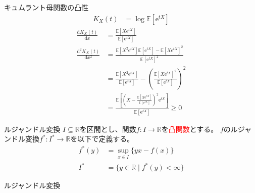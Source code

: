\documentclass[lualatex,handout]{beamer}
\newcommand{\emm}[1]{\textcolor{red}{#1}}
\newcommand{\expt}[1]{\mathbb{E}\left[#1\right]}
\theoremstyle{definition}
\begin{document}
\begin{frame}{キュムラント母関数の凸性}
\begin{align*}
K_X(t) &= \log \expt{\mathrm{e}^{tX}}
\end{align*}
\begin{align*}
\frac{\mathrm{d} K_X(t)}{\mathrm{d}x} &= \frac{\expt{X\mathrm{e}^{tX}}}{\expt{\mathrm{e}^{tX}}}\\
\frac{\mathrm{d}^2 K_X(t)}{\mathrm{d}x^2} &= \frac{\expt{X^2\mathrm{e}^{tX}}\expt{\mathrm{e}^{tX}}-\expt{X\mathrm{e}^{tX}}^2}{\expt{\mathrm{e}^{tX}}^2}\\
&= \frac{\expt{X^2\mathrm{e}^{tX}}}{\expt{\mathrm{e}^{tX}}}-\left(\frac{\expt{X\mathrm{e}^{tX}}^2}{\expt{\mathrm{e}^{tX}}}\right)^2\\
&= \frac{\expt{\left(X-\frac{\expt{X\mathrm{e}^{tX}}}{\expt{\mathrm{e}^{tX}}}\right)^2\mathrm{e}^{tX}}}{\expt{\mathrm{e}^{tX}}}\ge 0
\end{align*}
\end{frame}

\begin{frame}{ルジャンドル変換}
$I\subseteq\mathbb{R}$を区間とし、関数$f\colon I\to\mathbb{R}$を\emm{凸関数}とする。
$f$のルジャンドル変換$f^*\colon I^*\to\mathbb{R}$を以下で定義する。
\begin{align*}
f^*(y) &= \sup_{x\in I}\{yx - f(x)\}\\
I^*&=\{y\in\mathbb{R}\mid f^*(y)<\infty\}
\end{align*}
\end{frame}

\begin{frame}{ルジャンドル変換}
\centering
{}
\end{frame}
\end{document}
